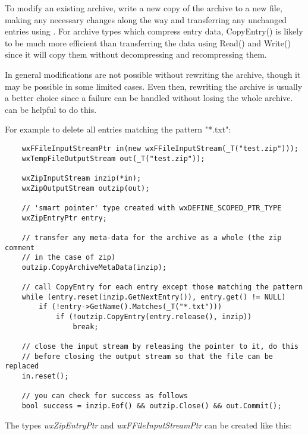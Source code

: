 
To modify an existing archive, write a new copy of the archive to a new file,
making any necessary changes along the way and transferring any unchanged
entries using .
For archive types which compress entry data, CopyEntry() is likely to be
much more efficient than transferring the data using Read() and Write()
since it will copy them without decompressing and recompressing them.

In general modifications are not possible without rewriting the archive,
though it may be possible in some limited cases. Even then, rewriting the
archive is usually a better choice since a failure can be handled without
losing the whole
archive.  can
be helpful to do this.

For example to delete all entries matching the pattern "*.txt":

\begin{verbatim}
    wxFFileInputStreamPtr in(new wxFFileInputStream(_T("test.zip")));
    wxTempFileOutputStream out(_T("test.zip"));

    wxZipInputStream inzip(*in);
    wxZipOutputStream outzip(out);

    // 'smart pointer' type created with wxDEFINE_SCOPED_PTR_TYPE
    wxZipEntryPtr entry;

    // transfer any meta-data for the archive as a whole (the zip comment
    // in the case of zip)
    outzip.CopyArchiveMetaData(inzip);

    // call CopyEntry for each entry except those matching the pattern
    while (entry.reset(inzip.GetNextEntry()), entry.get() != NULL)
        if (!entry->GetName().Matches(_T("*.txt")))
            if (!outzip.CopyEntry(entry.release(), inzip))
                break;

    // close the input stream by releasing the pointer to it, do this
    // before closing the output stream so that the file can be replaced
    in.reset();

    // you can check for success as follows
    bool success = inzip.Eof() && outzip.Close() && out.Commit();

\end{verbatim}

The  types {\em wxZipEntryPtr}
and {\em wxFFileInputStreamPtr} can be created like this:

